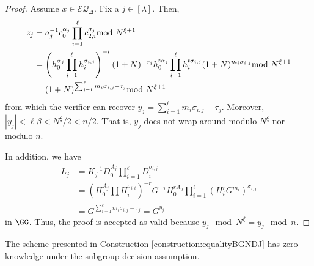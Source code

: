 \begin{proof}
Assume $x\in\mathcal{EQ}_\Delta$. Fix a $j\in [\lambda]$. Then, \begin{align*}
    z_{j}&=a_{j}^{-1}c_0^{\alpha_j}\prod_{i=1}^\ell c_{2,i}^{\sigma_{j}} \smod N^{\xi+1}\\ 
    &=\left(h_0^{\alpha_j}\prod_{i=1}^{\ell} h_i^{\sigma_{i,j}}\right)^{-t}(1+N)^{-\tau_{j}}h_0^{t\alpha_j}\prod_{i=1}^\ell h_i^{t\sigma_{i,j}} (1+N)^{m_i\sigma_{i,j}} \smod N^{\xi+1}\\ 
    &=(1+N)^{\sum_{i=1}^\ell m_i\sigma_{i,j}-\tau_{j}}\smod N^{\xi+1}
\end{align*} 
from which the verifier can recover $y_{j}=\sum_{i=1}^\ell m_i\sigma_{i,j}-\tau_{j}$.
 Moreover, $|y_j|<\ell \beta <N^\xi/2<n/2$. That is, $y_j$ does not wrap around modulo $N^\xi$ nor modulo $n$. 

In addition, we have \begin{align*}
    L_j &= K_j^{-1} D_0^{A_j}\prod_{i=1}^\ell D_i^{\sigma_{i,j}} \\ 
    &= \left  (H_0^{A_j}\prod H_i^{\sigma_{i,i}}\right)^{-r} G^{-\tau} H_0^{rA_0}\prod_{i=1}^\ell (H_i^rG^{m_i})^{\sigma_{i,j}}\\
    &= G^{\sum_{i=1}^\ell m_i\sigma_{i,j} -\tau_{j}} =G^{y_j}
\end{align*} in $\GG$.
Thus, the proof is accepted as valid because $y_j\mod N^\xi=y_j\mod n$.

\end{proof}


\begin{lemma}
The scheme presented in Construction \ref{construction:equalityBGNDJ} has zero knowledge under the subgroup decision assumption.
\end{lemma}



